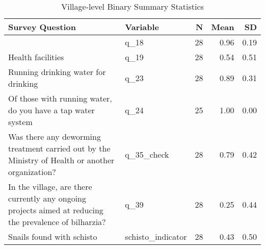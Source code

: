\begin{table}[H]
\caption*{
{\large Village-level Binary Summary Statistics}
} 
\fontsize{12.0pt}{14.4pt}\selectfont
\begin{tabular*}{\linewidth}{@{\extracolsep{\fill}}llrrr}
\toprule
Survey Question & Variable & N & Mean & SD \\ 
\midrule\addlinespace[2.5pt]
{Educational facilities} & {q\_18} & {28} & {0.96} & {0.19} \\ 
{Health facilities} & {q\_19} & {28} & {0.54} & {0.51} \\ 
{Running drinking water for drinking} & {q\_23} & {28} & {0.89} & {0.31} \\ 
{Of those with running water, do you have a tap water system} & {q\_24} & {25} & {1.00} & {0.00} \\ 
{Was there any deworming treatment carried out by the Ministry of Health or another organization?} & {q\_35\_check} & {28} & {0.79} & {0.42} \\ 
{In the village, are there currently any ongoing projects aimed at reducing the prevalence of bilharzia?} & {q\_39} & {28} & {0.25} & {0.44} \\ 
{Snails found with schisto} & {schisto\_indicator} & {28} & {0.43} & {0.50} \\ 
\bottomrule
\end{tabular*}
\end{table}

